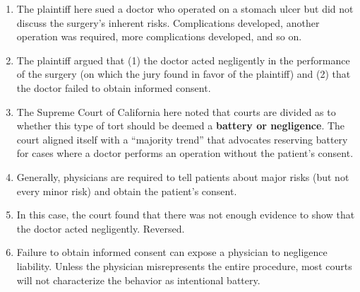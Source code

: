 \begin{enumerate}
    \item The plaintiff here sued a doctor who operated on a stomach ulcer 
    but did not discuss the surgery's inherent risks. Complications developed, 
    another operation was required, more complications developed, and so on.
    \item The plaintiff argued that (1) the doctor acted negligently in the 
    performance of the surgery (on which the jury found in favor of the 
    plaintiff) and (2) that the doctor failed to obtain informed consent.
    \item The Supreme Court of California here noted that courts are divided 
    as to whether this type of tort should be deemed a \textbf{battery or 
    negligence}. The court aligned itself with a ``majority trend'' that 
    advocates reserving battery for cases where a doctor performs an operation 
    without the patient's consent.
    \item Generally, physicians are required to tell 
    patients about major risks (but not every minor risk) and obtain the 
    patient's consent.
    \item In this case, the court found that there was not enough 
    evidence to show that the doctor acted negligently. Reversed.
    \item Failure to obtain informed consent can expose a physician to 
    negligence liability. Unless the physician misrepresents the entire 
    procedure, most courts will not characterize the behavior as intentional 
    battery.
\end{enumerate}
